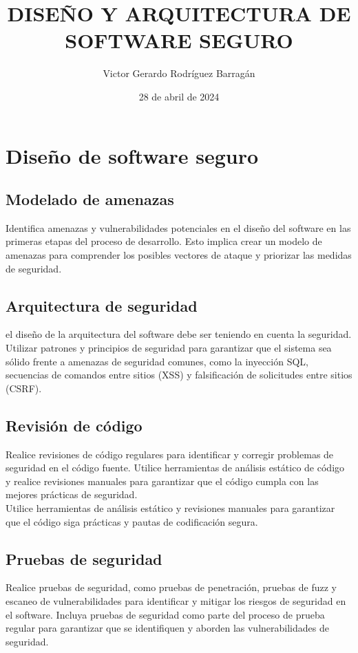 \documentclass{article}
\title{DISEÑO Y ARQUITECTURA DE SOFTWARE SEGURO}
\author{Victor Gerardo Rodríguez Barragán}
\date{28 de abril de 2024}
\begin{document}
\maketitle
\tableofcontents
\justify
\newpage
\section{Diseño de software seguro}
\subsection{Modelado de amenazas}
Identifica amenazas y vulnerabilidades potenciales en el diseño del software en las primeras etapas del proceso de desarrollo. Esto implica crear un modelo de amenazas para comprender los posibles vectores de ataque y priorizar las medidas de seguridad.
\subsection{Arquitectura de seguridad}
el diseño de la arquitectura del software debe ser teniendo en cuenta la seguridad. Utilizar patrones y principios de seguridad para garantizar que el sistema sea sólido frente a amenazas de seguridad comunes, como la inyección SQL, secuencias de comandos entre sitios (XSS) y falsificación de solicitudes entre sitios (CSRF).
\subsection{Revisión de código}
Realice revisiones de código regulares para identificar y corregir problemas de seguridad en el código fuente. Utilice herramientas de análisis estático de código y realice revisiones manuales para garantizar que el código cumpla con las mejores prácticas de seguridad.
\vspace{0.25cm}\\
Utilice herramientas de análisis estático y revisiones manuales para garantizar que el código siga prácticas y pautas de codificación segura.
\subsection{Pruebas de seguridad}
Realice pruebas de seguridad, como pruebas de penetración, pruebas de fuzz y escaneo de vulnerabilidades para identificar y mitigar los riesgos de seguridad en el software. Incluya pruebas de seguridad como parte del proceso de prueba regular para garantizar que se identifiquen y aborden las vulnerabilidades de seguridad.
\end{document}
